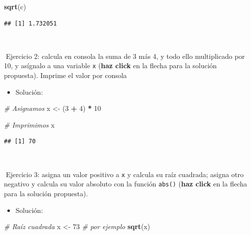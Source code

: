 \documentclass[11pt,]{book}
\newenvironment{Shaded}{\begin{snugshade}}{\end{snugshade}}
\newcommand{\CommentTok}[1]{\textcolor[rgb]{0.37,0.37,0.37}{\textit{#1}}}
\newcommand{\DecValTok}[1]{\textcolor[rgb]{0.06,0.06,0.06}{#1}}
\newcommand{\KeywordTok}[1]{\textcolor[rgb]{0.27,0.27,0.27}{\textbf{#1}}}
\newcommand{\NormalTok}[1]{#1}
\newcommand{\OperatorTok}[1]{\textcolor[rgb]{0.43,0.43,0.43}{\textbf{#1}}}
\newcommand{\StringTok}[1]{\textcolor[rgb]{0.5,0.5,0.5}{#1}}
\providecommand{\tightlist}{%
  \setlength{\itemsep}{0pt}\setlength{\parskip}{0pt}}
\begin{document}
\begin{Shaded}
\begin{Highlighting}[]
\KeywordTok{sqrt}\NormalTok{(c)}
\end{Highlighting}
\end{Shaded}

\begin{verbatim}
## [1] 1.732051
\end{verbatim}

~

📝Ejercicio 2: calcula en consola la suma de 3 más 4, y todo ello multiplicado por 10, y asígnalo a una variable \texttt{x} (\textbf{haz click} en la flecha para la solución propuesta). Imprime el valor por consola

\begin{itemize}
\tightlist
\item
  Solución:
\end{itemize}

\begin{Shaded}
\begin{Highlighting}[]
\CommentTok{# Asignamos}
\NormalTok{x <-}\StringTok{ }\NormalTok{(}\DecValTok{3} \OperatorTok{+}\StringTok{ }\DecValTok{4}\NormalTok{) }\OperatorTok{*}\StringTok{ }\DecValTok{10}

\CommentTok{# Imprimimos}
\NormalTok{x}
\end{Highlighting}
\end{Shaded}

\begin{verbatim}
## [1] 70
\end{verbatim}

~

📝Ejercicio 3: asigna un valor positivo a \texttt{x} y calcula su raíz cuadrada; asigna otro negativo y calcula su valor absoluto con la función \texttt{abs()} (\textbf{haz click} en la flecha para la solución propuesta).

\begin{itemize}
\tightlist
\item
  Solución:
\end{itemize}

\begin{Shaded}
\begin{Highlighting}[]
\CommentTok{# Raíz cuadrada}
\NormalTok{x <-}\StringTok{ }\DecValTok{73} \CommentTok{# por ejemplo}
\KeywordTok{sqrt}\NormalTok{(x)}
\end{Highlighting}
\end{Shaded}
\end{document}
